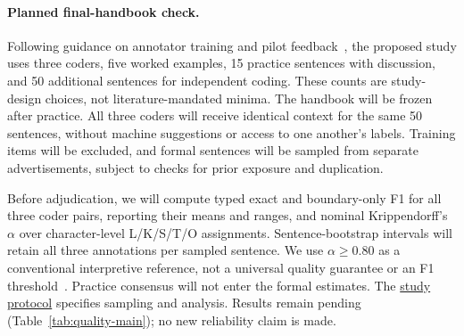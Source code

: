 \paragraph{Planned final-handbook check.}
Following guidance on annotator training and pilot feedback~\citep{klie2024annotationquality}, the proposed study uses three coders, five worked examples, 15 practice sentences with discussion, and 50 additional sentences for independent coding. These counts are study-design choices, not literature-mandated minima. The handbook will be frozen after practice. All three coders will receive identical context for the same 50 sentences, without machine suggestions or access to one another's labels. Training items will be excluded, and formal sentences will be sampled from separate advertisements, subject to checks for prior exposure and duplication.

Before adjudication, we will compute typed exact and boundary-only F1 for all three coder pairs, reporting their means and ranges, and nominal Krippendorff's $\alpha$ over character-level L/K/S/T/O assignments. Sentence-bootstrap intervals will retain all three annotations per sampled sentence. We use $\alpha\geq0.80$ as a conventional interpretive reference, not a universal quality guarantee or an F1 threshold~\citep{artstein2008agreement}. Practice consensus will not enter the formal estimates. The \href{https://github.com/AlfredJamesLi/chinese-skillspan-benchmark/blob/main/notes/handbooks/training/protocol.md}{study protocol} specifies sampling and analysis. Results remain pending (Table~\ref{tab:quality-main}); no new reliability claim is made.
